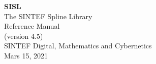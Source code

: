 \documentclass[a4paper]{report}
\begin{document}
\begin{titlepage}
  \vspace{5 cm}
  \begin{center}
  \Huge
  \textbf{SISL} \\
  \huge
  The SINTEF Spline Library \\ 
  \LARGE
  Reference Manual \\
  (version 4.5)\\ 
  \vspace{10 mm}
  \large
  SINTEF Digital, Mathematics and Cybernetics \\
  Mars 15, 2021
  \end{center}

\end{titlepage}

\tableofcontents
\cleardoublepage
{}
\setcounter{page}{1}


\cleardoublepage

\cleardoublepage

\cleardoublepage

\cleardoublepage

\cleardoublepage

\cleardoublepage

\cleardoublepage

\cleardoublepage

\cleardoublepage

\cleardoublepage


\cleardoublepage

\cleardoublepage

\cleardoublepage
\printindex
\end{document}
